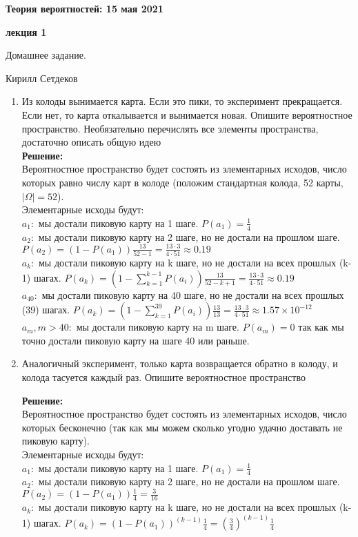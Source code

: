 \documentclass[a4paper,12pt]{article}
\newcounter{z}
\renewcommand{\date}{{\bf 15 мая 2021}}
\newcommand{\HSEhat}{
\vspace*{-0pt}
\noindent
\setcounter{z}{0}


{\bf \phantom{\date}  \large \hfill Теория вероятностей: \hfill \normalsize \date}

\vspace{5 pt}
{\bf \large \hfill  лекция 1\hfill }

\vspace{15 pt}
\centerline{ \large  Домашнее задание.}
\centerline{ \large  Кирилл Сетдеков}



\vspace*{10pt}
\setcounter{z}{0}

}
\begin{document}
\HSEhat


\begin{enumerate}

\subsection*{Задачи:}



\item Из колоды вынимается карта. Если это пики, то эксперимент прекращается. Если нет, то карта откалывается и вынимается новая. Опишите вероятностное пространство. Необязательно перечислять все элементы пространства, достаточно описать общую идею\\
\textbf{Решение:}\\
Вероятностное пространство будет состоять из элементарных исходов, число которых равно числу карт в колоде (положим стандартная колода, 52 карты, $|\Omega|=52$).\\
Элементарные исходы будут:\\
$a_1:$ мы достали пиковую карту на 1 шаге. $P(a_1)=\frac{1}{4}$\\
$a_2:$ мы достали пиковую карту на 2 шаге, но не достали на прошлом шаге. $P(a_2)=(1-P(a_1))\frac{13}{52-1}=\frac{13\cdot3}{4\cdot51} \approx 0.19$\\
$a_k:$ мы достали пиковую карту на k шаге, но не достали на всех прошлых (k-1) шагах. $P(a_k)=(1-\sum_{k=1}^{k-1}P(a_i))\frac{13}{52-k+1}=\frac{13\cdot3}{4\cdot51} \approx 0.19$\\
$a_{40}:$ мы достали пиковую карту на 40 шаге, но не достали на всех прошлых (39) шагах. $P(a_k)=(1-\sum_{k=1}^{39}P(a_i))\frac{13}{13}=\frac{13\cdot3}{4\cdot51} \approx 1.57 \times 10^{-12}$\\
$a_{m}, m>40:$ мы достали пиковую карту на m шаге. $P(a_m)=0$ так как мы точно достали пиковую карту на шаге 40 или раньше. 




\item Аналогичный эксперимент, только карта возвращается обратно в колоду, и колода тасуется каждый раз. Опишите вероятностное пространство

\textbf{Решение:}\\
Вероятностное пространство будет состоять из элементарных исходов, число которых бесконечно (так как мы можем сколько угодно удачно доставать не пиковую карту).\\
Элементарные исходы будут:\\
$a_1:$ мы достали пиковую карту на 1 шаге. $P(a_1)=\frac{1}{4}$\\
$a_2:$ мы достали пиковую карту на 2 шаге, но не достали на прошлом шаге. $P(a_2)=(1-P(a_1))\frac{1}{4}=\frac{3}{16}$\\
$a_k:$ мы достали пиковую карту на k шаге, но не достали на всех прошлых (k-1) шагах. $P(a_k)=(1-P(a_1))^{(k-1)}\frac{1}{4}=(\frac{3}{4})^{(k-1)}\frac{1}{4}$


\end{enumerate}
\end{document}
